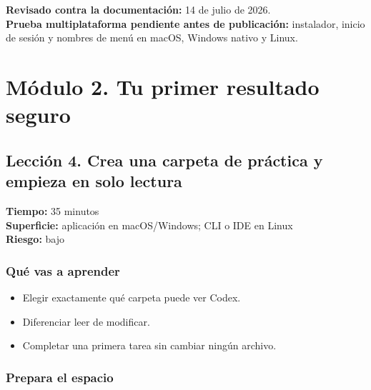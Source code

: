 \documentclass[10pt,a4paper,openany]{book}
\providecommand{\tightlist}{\setlength{\itemsep}{0.18em}\setlength{\parskip}{0pt}}
\begin{document}
\textbf{Revisado contra la documentación:} 14 de julio de 2026.\\
\textbf{Prueba multiplataforma pendiente antes de publicación:}
instalador, inicio de sesión y nombres de menú en macOS, Windows nativo
y Linux.

\chapter{Módulo 2. Tu primer resultado
seguro}\label{muxf3dulo-2.-tu-primer-resultado-seguro}

\clearpage

\section{Lección 4. Crea una carpeta de práctica y empieza en solo
lectura}\label{lecciuxf3n-4.-crea-una-carpeta-de-pruxe1ctica-y-empieza-en-solo-lectura}

\begin{metabox}

\textbf{Tiempo:} 35 minutos\\
\textbf{Superficie:} aplicación en macOS/Windows; CLI o IDE en Linux\\
\textbf{Riesgo:} bajo

\end{metabox}

\subsection{Qué vas a aprender}\label{quuxe9-vas-a-aprender-3}

\begin{itemize}
\tightlist
\item
  Elegir exactamente qué carpeta puede ver Codex.
\item
  Diferenciar leer de modificar.
\item
  Completar una primera tarea sin cambiar ningún archivo.
\end{itemize}

\subsection{Prepara el espacio}\label{prepara-el-espacio}
\end{document}
